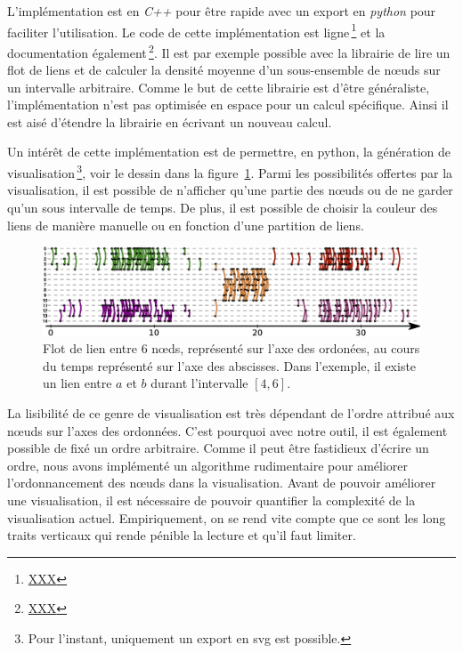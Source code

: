 L'implémentation est en \emph{C++} pour être rapide avec un export en \emph{python} pour faciliter l'utilisation.
Le code de cette implémentation est ligne\,\footnote{\url{XXX}} et la documentation également\,\footnote{\url{XXX}}.
Il est par exemple possible avec la librairie de lire un flot de liens et de calculer la densité moyenne d'un sous-ensemble de n\oe uds sur un intervalle arbitraire.
Comme le but de cette librairie est d'être généraliste, l'implémentation n'est pas optimisée en espace pour un calcul spécifique.
Ainsi il est aisé d'étendre la librairie en écrivant un nouveau calcul.
 

Un intérêt de cette implémentation est de permettre, en python, la génération de visualisation\,\footnote{Pour  l'instant, uniquement un export en svg est possible.}, voir le dessin dans la figure~\ref{fig:exemple_Flot_de_liens_lib}.
Parmi les possibilités offertes par la visualisation, il est possible de n'afficher qu'une partie des n\oe uds ou de ne garder qu'un sous intervalle de temps.
De plus, il est possible de choisir la couleur des liens de manière manuelle ou en fonction d'une partition de liens.

\begin{figure}
\centering
\includegraphics[width=\linewidth]{img/Intro/Dessin_Flot.eps}
\caption{Flot de lien entre $6$ n\oe ds, représenté sur l'axe des ordonées, au cours du temps représenté sur l'axe des abscisses.
Dans l'exemple, il existe un lien entre $a$ et $b$ durant l'intervalle $[4,6]$.
}
\label{fig:exemple_Flot_de_liens_lib}
\end{figure}

La lisibilité de ce genre de visualisation est très dépendant de l'ordre attribué aux n\oe uds sur l'axes des ordonnées.
C'est pourquoi avec notre outil, il est également possible de fixé un ordre arbitraire.
Comme il peut être fastidieux d'écrire un ordre, nous avons implémenté un algorithme rudimentaire pour améliorer l'ordonnancement des n\oe uds dans la visualisation.
Avant de pouvoir améliorer une visualisation, il est nécessaire de pouvoir quantifier la complexité de la visualisation actuel.
Empiriquement, on se rend vite compte que ce sont les long traits verticaux qui rende pénible la lecture et qu'il faut limiter.

